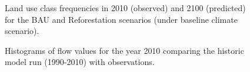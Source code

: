 \begin{figure}[h!]
 \caption{Land use class frequencies in 2010 (observed) and 2100 (predicted) for the BAU and Reforestation scenarios (under baseline climate scenario).}
 \label{fig:bar_both}
\end{figure}


\begin{figure}[h!]
 \caption{Histograms of flow values for the year 2010 comparing the historic model run (1990-2010) with observations.}
 \label{fig:hist_historic}
\end{figure}




